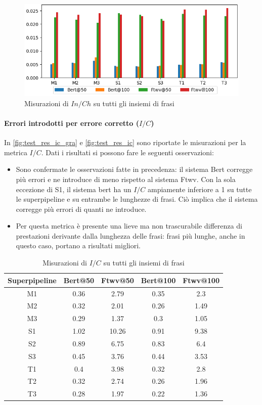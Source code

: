 \begin{figure}[H]
\centering
\includegraphics[width=\textwidth]{immagini/test/if}
\caption{Misurazioni di $In/Ch$ su tutti gli insiemi di frasi}
\label{fig:test_res_if}
\end{figure}

\paragraph{Errori introdotti per errore corretto ($I/C$)}
In \autoref{fig:test_res_ic_gra} e \autoref{fig:test_res_ic} sono riportate le misurazioni per la metrica $I/C$. Dati i risultati si possono fare le seguenti osservazioni:
\begin{itemize}
\item Sono confermate le osservazioni fatte in precedenza: il sistema Bert corregge più errori e ne introduce di meno rispetto al sistema Ftwv. Con la sola eccezione di S1, il sistema bert ha un $I/C$ ampiamente inferiore a 1 su tutte le superpipeline e su entrambe le lunghezze di frasi. Ciò implica che il sistema corregge più errori di quanti ne introduce.

\item Per questa metrica è presente una lieve ma non trascurabile differenza di prestazioni derivante dalla lunghezza delle frasi: frasi più lunghe, anche in questo caso, portano a risultati migliori.
\end{itemize}

\begin{table}[H]
\centering
\begin{tabular}{c|cc|cc}
\textbf{Superpipeline} & \textbf{Bert@50} &  \textbf{Ftwv@50} & \textbf{Bert@100} & \textbf{Ftwv@100}\\
\hline
M1& 0.36& 2.79& 0.35& 2.3\\
M2& 0.32& 2.01& 0.26& 1.49\\
M3& 0.29& 1.37& 0.3& 1.05\\
S1& 1.02& 10.26& 0.91& 9.38\\
S2& 0.89& 6.75& 0.83& 6.4\\
S3& 0.45& 3.76& 0.44& 3.53\\
T1& 0.4& 3.98& 0.32& 2.8\\
T2& 0.32& 2.74& 0.26& 1.96\\
T3& 0.28& 1.97& 0.22& 1.36\\
\end{tabular}
\caption{Misurazioni di $I/C$ su tutti gli insiemi di frasi}
\label{fig:test_res_ic_gra}
\end{table}

